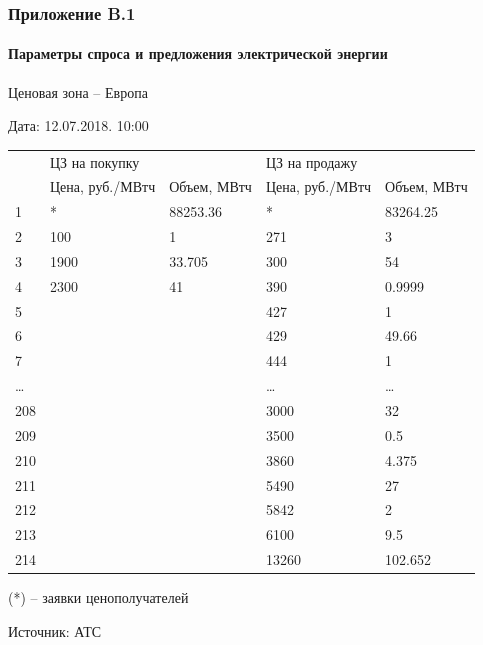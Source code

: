 \documentclass[c, dvipsnames]{beamer}  %
\begin{document}
\begin{frame}[shrink=5]
\frametitle{Приложение B.1} 
\framesubtitle{Параметры спроса и предложения электрической энергии} 

Ценовая зона --  Европа 

Дата: 12.07.2018. 10:00 


\begin{table}[]
	\begin{tabular}{l|ll|ll}
		 & ЦЗ на покупку &  & ЦЗ на продажу &  \\
		& Цена, руб./МВтч & Объем, МВтч & Цена, руб./МВтч & Объем, МВтч \\\hline\hline
		1 & * & 88253.36 & * & 83264.25 \\\hline
		2 & 100 & 1 & 271 & 3 \\\hline
		3 & 1900 & 33.705 & 300 & 54 \\
		4 & 2300 & 41 & 390 & 0.9999 \\\hline
		5 &  &  & 427 & 1 \\
		6 &  &  & 429 & 49.66 \\
		7 &  &  & 444 & 1 \\
		… &  &  & … & … \\
		208 &  &  & 3000 & 32 \\
		209 &  &  & 3500 & 0.5 \\
		210 &  &  & 3860 & 4.375 \\
		211 &  &  & 5490 & 27 \\
		212 &  &  & 5842 & 2 \\
		213 &  &  & 6100 & 9.5 \\
		214 &  &  & 13260 & 102.652\\\hline
	\end{tabular}
\end{table}

(*) -- заявки ценополучателей

Источник: АТС

\end{frame}

%
%
%
%
%
%
%
%
%
%
%
%
\end{document}
